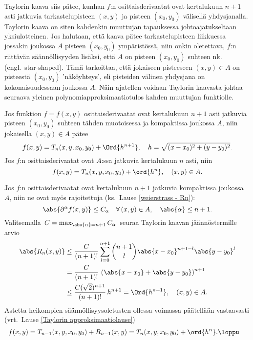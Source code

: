 Taylorin kaava siis pätee, kunhan $f$:n osittaisderivaatat ovat kertalukuun $n+1$ asti jatkuvia
tarkastelupisteen $(x,y)$ ja pisteen $(x_0,y_0)$ välisellä yhdysjanalla. Taylorin kaava
on siten kahdenkin muuttujan  tapauksessa johtoajatukseltaan yksiulotteinen. Jos halutaan, että
kaava pätee tarkastelupisteen liikkuessa jossakin joukossa $A$ pisteen $(x_0,y_0)$
ympäristössä, niin onkin oletettava, $f$:n riittävän säännöllisyyden lisäksi, että $A$ on
%
pisteen $(x_0,y_0)$ suhteen nk.  (engl.\ star-shaped). Tämä tarkoittaa,
että jokaiseen pisteeseen $(x,y)\in A$ on pisteestä $(x_0,y_0)$ 'näköyhteys', eli pisteiden
välinen yhdysjana on kokonaisuudessaan joukossa $A$. Näin ajatellen voidaan Taylorin kaavasta
johtaa seuraava yleinen polynomiapproksimaatiotulos kahden muuttujan funktiolle.
\begin{Lause} \label{Taylor-R2} 
Jos funktion $f=f(x,y)$ osittaisderivaatat ovat kertalukuun $n+1$ asti jatkuvia pisteen 
$(x_0,y_0)$ suhteen tähden muotoisessa ja kompaktissa joukossa $A$, niin jokaisella 
$(x,y)\in A$ pätee
\[
f(x,y)=T_n(x,y,x_0,y_0)+\Ord{h^{n+1}}, \quad h=\sqrt{(x-x_0)^2+(y-y_0)^2}.
\]
Jos $f$:n osittaisderivaatat ovat $A$:ssa jatkuvia  kertalukuun $n$ asti, niin 
\[
f(x,y)=T_n(x,y,x_0,y_0)+\ord{h^n}, \quad (x,y) \in A.
\]
\end{Lause}
\tod Jos $f$:n osittaisderivaatat ovat kertalukuun $n+1$ jatkuvia kompaktissa joukossa $A$,
niin ne ovat myös rajoitettuja (ks.\ Lause \ref{weierstrass - Rn}):
\[
\abs{\partial^\alpha f(x,y)}\leq C_\alpha\quad\forall\,(x,y) \in A,\quad \abs{\alpha}\leq n+1.
\]
Valitsemalla $\,C=\max_{\abs{\alpha}=n+1} C_\alpha\,$ seuraa Taylorin kaavan jäännöstermille arvio
\begin{align*}
\abs{R_n(x,y)} &\le \frac{C}{(n+1)!}\sum_{l=0}^{n+1} 
                                    \binom{n+1}{l}\abs{x-x_0}^{n+1-l}\abs{y-y_0}^l \\
               &=\frac{C}{(n+1)!}\,\left(\abs{x-x_0}+\abs{y-y_0}\right)^{n+1} \\
               &\le \frac{C(\sqrt{2})^{n+1}}{(n+1)!}\,h^{n+1}=\Ord{h^{n+1}}, \quad (x,y) \in A.
\end{align*}
Astetta heikompien säännöllisyysoletusten ollessa voimassa päätellään vastaavasti
(vrt.\ Lause \ref{Taylorin approksimaatiolause})
\begin{align*}
f(x,y) &= T_{n-1}(x,y,x_0,y_0)+R_{n-1}(x,y) = T_n(x,y,x_0,y_0)+\ord{h^n}. \loppu
\end{align*}

